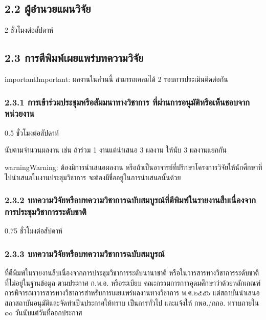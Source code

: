 \documentclass[a4paper,12pt,english]{sphinxmanual}
\begin{document}
\subsection{2.2 ผู้อำนวยแผนวิจัย}
\label{\detokenize{workload_rubric:id30}}
2 ชั่วโมงต่อสัปดาห์


\subsection{2.3 การตีพิมพ์เผยแพร่บทความวิจัย}
\label{\detokenize{workload_rubric:id31}}\label{\detokenize{workload_rubric:id32}}
\begin{sphinxadmonition}{important}{Important:}
ผลงานในส่วนนี้ สามารถเคลมได้ 2 รอบการประเมินติดต่อกัน
\end{sphinxadmonition}


\subsubsection{2.3.1 การเข้าร่วมประชุมหรือสัมมนาทางวิชาการ ที่ผ่านการอนุมัติหรือเห็นชอบจากหน่วยงาน}
\label{\detokenize{workload_rubric:id33}}
0.5 ชั่วโมงต่อสัปดาห์

นับตามจำนวนผลงาน เช่น ถ้าร่วม 1 งานแต่นำเสนอ 3 ผลงาน ให้นับ 3 ผลงานแยกกัน

\begin{sphinxadmonition}{warning}{Warning:}
ต้องมีการนำเสนอผลงาน หรือถ้าเป็นอาจารย์ที่ปรึกษาโครงการวิจัยให้นักศึกษาที่ไปนำเสนอในงานประชุมวิชาการ จะต้องมีชื่ออยู่ในการนำเสนอนั้นด้วย
\end{sphinxadmonition}


\subsubsection{2.3.2 บทความวิจัยหรือบทความวิชาการฉบับสมบูรณ์ที่ตีพิมพ์ในรายงานสืบเนื่องจากการประชุมวิชาการระดับชาติ}
\label{\detokenize{workload_rubric:id34}}
0.75 ชั่วโมงต่อสัปดาห์


\subsubsection{2.3.3 บทความวิจัยหรือบทความวิชาการฉบับสมบูรณ์}
\label{\detokenize{workload_rubric:id35}}
ที่ตีพิมพ์ในรายงานสืบเนื่องจากการประชุมวิชาการระดับนานาชาติ หรือในวารสารทางวิชาการระดับชาติที่ไม่อยู่ในฐานข้อมูล ตามประกาศ ก.พ.อ. หรือระเบียบ คณะกรรมการการอุดมศึกษาว่าด้วยหลักเกณฑ์การพิจารณาวารสารทางวิชาการสำหรับการเผยแพร่ผลงานทางวิชาการ พ.ศ.๒๕๕๖ แต่สถาบันนำเสนอสภาสถาบันอนุมัติและจัดทำเป็นประกาศให้ทราบ เป็นการทั่วไป และแจ้งให้ กพอ./กกอ. ทราบภายใน ๓๐ วันนับแต่วันที่ออกประกาศ
\end{document}
